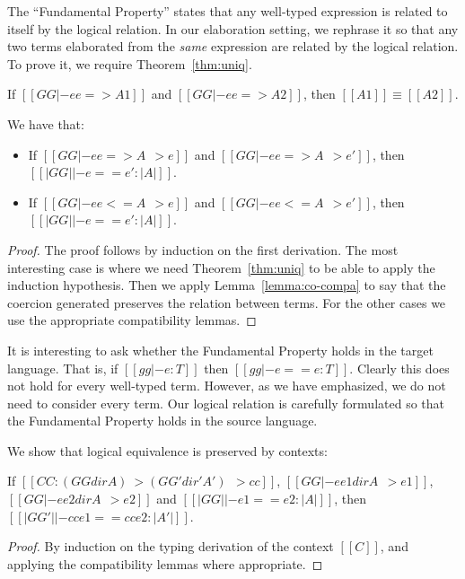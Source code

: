 The ``Fundamental Property'' states that any well-typed expression is related to
itself by the logical relation. In our elaboration setting, we rephrase it so
that any two \tname terms elaborated from the \textit{same} \name expression are related
by the logical relation. To prove it, we require Theorem~\ref{thm:uniq}.

\begin{theorem} \label{thm:uniq}
  If $[[GG |- ee => A1]]$ and $[[GG |- ee => A2]]$, then $[[A1]] \equiv [[A2]]$.
\end{theorem}

\begin{theorem}  \label{thm:co-log} We have that:
  \begin{itemize}
  \item If $[[GG |- ee => A ~~> e]]$ and $[[GG |- ee => A ~~> e']]$, then $[[|GG| |- e == e' : |A| ]]$.
  \item If $[[GG |- ee <= A ~~> e]]$ and $[[GG |- ee <= A ~~> e']]$, then $[[|GG| |- e == e' : |A| ]]$.
  \end{itemize}
\end{theorem}
\begin{proof}
  The proof follows by induction on the first derivation. The most interesting case is 
  where we need Theorem~\ref{thm:uniq} to be able to
  apply the induction hypothesis. Then we apply Lemma~\ref{lemma:co-compa} to say
  that the coercion generated preserves the relation between terms. For the other cases
  we use the appropriate compatibility lemmas.
\end{proof}
\begin{remark}
  It is interesting to ask whether the Fundamental Property holds in the target language. That is,
  if $[[gg |- e : T]]$ then $[[gg |- e == e : T]]$. Clearly this does not
  hold for every well-typed \tname term. However, as we have emphasized, we do
  not need to consider every \tname term. Our logical relation is carefully formulated
  so that the Fundamental Property holds in the source language.
\end{remark}


We show that logical equivalence is preserved by \name contexts:

\begin{lemma}[Congruence] \label{lemma:cong}
 If $[[CC : (GG dir A) ~> (GG' dir' A') ~~> cc]]$, $[[GG |- ee1 dir A ~~> e1]]$, $[[GG |- ee2 dir A ~~> e2]]$
 and $[[|GG| |- e1 == e2 : |A|]]$, then $[[|GG'| |- cc{e1} == cc{e2} : |A'|]]$.
\end{lemma}
\begin{proof}
  By induction on the typing derivation of the context $[[C]]$, and applying
  the compatibility lemmas where appropriate.
\end{proof}



